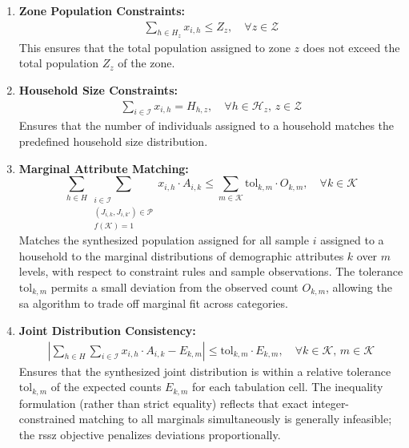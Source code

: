 \begin{enumerate}[label=\textbf{C\arabic*}, ref=C\arabic*]

    \item \textbf{Zone Population Constraints:}
    \begin{align}
        \sum_{h \in H_z} x_{i,h} \leq Z_z, \quad \forall z \in \mathcal{Z}
        \label{eq:zone_population}
    \end{align}  
    This ensures that the total population assigned to zone \( z \) does not exceed the total population \( Z_z \) of the zone.

    \item \textbf{Household Size Constraints:}
    \begin{align}
        \sum_{i \in \mathcal{I}} x_{i,h} = H_{h,z}, \quad \forall h \in \mathcal{H}_z, \, z \in \mathcal{Z}
        \label{eq:household_size}
    \end{align}
    Ensures that the number of individuals assigned to a household matches the predefined household size distribution.

  \item  \textbf{Marginal Attribute Matching:}
\begin{equation}
\sum_{h \in H} \sum_{\substack{i \in \mathcal{I} \\ (J_{i,k}, J_{i, k'}) \in \mathcal{P} \\ f(\mathcal{K}) =1 }} x_{i,h} \cdot A_{i,k} \leq \sum_{m \in \mathcal{K}} \text{tol}_{k,m} \cdot O_{k,m}, \quad \forall k \in \mathcal{K}
\label{eq:marginal_matching}
\end{equation}
    Matches the synthesized population assigned for all sample $i$ assigned to a household to the marginal distributions of demographic attributes $k$ over $m$ levels, with respect to constraint rules and sample observations. The tolerance \(\text{tol}_{k,m}\) permits a small deviation from the observed count \(O_{k,m}\), allowing the \gls{sa} algorithm to trade off marginal fit across categories.

    \item \textbf{Joint Distribution Consistency:} %
    \begin{align}
        \left| \sum_{h \in H} \sum_{i \in \mathcal{I}} x_{i,h} \cdot A_{i,k} - E_{k,m} \right| \leq \text{tol}_{k,m} \cdot E_{k,m}, \quad \forall k \in \mathcal{K}, \, m \in \mathcal{K}
        \label{eq:joint_distribution}
    \end{align}
    Ensures that the synthesized joint distribution is within a relative tolerance $\text{tol}_{k,m}$ of the expected counts $E_{k,m}$ for each tabulation cell. The inequality formulation (rather than strict equality) reflects that exact integer-constrained matching to all marginals simultaneously is generally infeasible; the \gls{rssz} objective penalizes deviations proportionally.


\end{enumerate}
